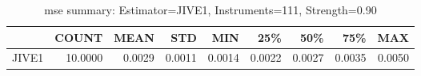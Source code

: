 \begin{table}[ht]
\centering
\caption{mse summary: Estimator=JIVE1, Instruments=111, Strength=0.90}
\begin{tabular}{lrrrrrrrr}
\toprule
 & COUNT & MEAN & STD & MIN & 25\% & 50\% & 75\% & MAX \\
\midrule
JIVE1 & 10.0000 & 0.0029 & 0.0011 & 0.0014 & 0.0022 & 0.0027 & 0.0035 & 0.0050 \\
\bottomrule
\end{tabular}
\end{table}
